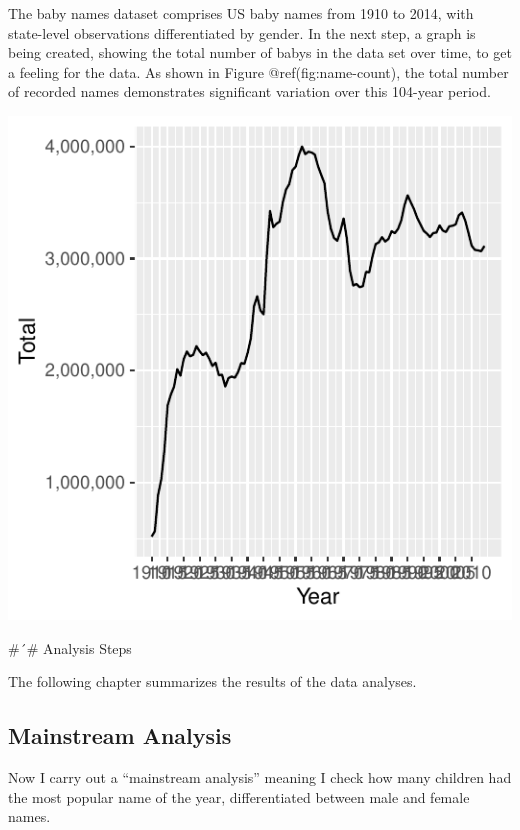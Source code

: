 \documentclass[11pt,preprint]{elsarticle}
\let\origfigure\figure
\let\endorigfigure\endfigure
\renewenvironment{figure}[1][2] {
    \expandafter\origfigure\expandafter[H]
} {
    \endorigfigure
}
\numberwithin{equation}{section}
\numberwithin{figure}{section}
\numberwithin{table}{section}
\begin{document}
The baby names dataset comprises US baby names from 1910 to 2014, with
state-level observations differentiated by gender. In the next step, a
graph is being created, showing the total number of babys in the data
set over time, to get a feeling for the data. As shown in Figure
@ref(fig:name-count), the total number of recorded names demonstrates
significant variation over this 104-year period.

\begin{figure}

{\centering \includegraphics{Task_1_files/figure-latex/name-count-1} 

}

\caption{Annual Count of Unique Baby Names in the U.S., 1910-2014}\label{fig:name-count}
\end{figure}

\#´\# Analysis Steps

The following chapter summarizes the results of the data analyses.

\subsection{Mainstream Analysis}\label{mainstream-analysis}

Now I carry out a ``mainstream analysis'' meaning I check how many
children had the most popular name of the year, differentiated between
male and female names.
\end{document}
